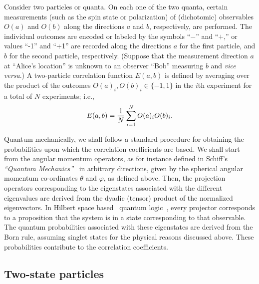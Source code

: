 \documentclass[fleqn,twoside]{article}      %
\begin{document}
Consider two particles or quanta. On each one of the two quanta, certain measurements
(such as the spin state or polarization) of
(dichotomic) observables
$O({ a})$ and
$O({ b})$
along the directions $a$ and $b$, respectively, are performed.
The individual outcomes are
encoded or labeled by the symbols ``$-$'' and  ``$+$,'' or values ``-1'' and ``+1'' are recorded along
the directions ${ a}$ for the first particle, and  ${ b}$ for the second particle, respectively.
(Suppose that the measurement direction ${a}$ at ``Alice's location''
is unknown to an observer ``Bob'' measuring ${ b}$ and {\it vice versa}.)
A two-particle correlation function $E(a,b )$
is defined by averaging over the product of the outcomes $O({ a})_i, O({ b} )_i\in \{-1,1\}$
in the $i$th experiment for a total of $N$ experiments; i.e.,
\begin{equation}
E(a,b )={1\over N}\sum_{i=1}^N O({ a})_i O({ b})_i.
\end{equation}


Quantum mechanically, we shall follow a standard procedure for obtaining the probabilities upon which the correlation coefficients are based.
We shall start from the angular momentum operators, as for instance defined in Schiff's {\em ``Quantum Mechanics''}~\cite[Chap.~VI, Sec.24]{schiff-55}
in arbitrary directions, given by the spherical angular momentum co-ordinates $\theta$ and $\varphi$, as defined above.
Then, the projection operators corresponding to the eigenstates associated with the different eigenvalues are derived
from the dyadic (tensor) product of the normalized eigenvectors.
In Hilbert space based~\cite{v-neumann-49} quantum logic~\cite{birkhoff-36}, every projector corresponds to
a proposition that the system is in a state corresponding to that observable.
The quantum probabilities associated with these eigenstates are derived from the Born rule, assuming singlet states for the physical reasons discussed above.
These probabilities contribute to the  correlation coefficients.

\subsection{Two-state particles}

\end{document}
